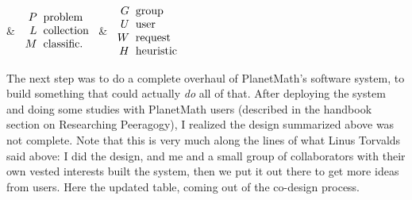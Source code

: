 \begin{center}
{\begin{tabular}
&
$\begin{array}{r@{\hspace{2mm}}l}
P &\mathrm{problem} \\
L &\mathrm{collection} \\
M &\mathrm{classific.}
\end{array}$ &
$\begin{array}{r@{\hspace{2mm}}l}
G &\mathrm{group}\\
U &\mathrm{user}\\
W &\mathrm{request} \\
H &\mathrm{heuristic}
\end{array}$
\\
\hline
\end{tabular}
}
\end{center}

The next step was to do a complete overhaul of PlanetMath's software
system, to build something that could actually \emph{do} all of that.
After deploying the system and doing some studies with PlanetMath users
(described in the handbook section on Researching Peeragogy), I realized
the design summarized above was not complete. Note that this is very
much along the lines of what Linus Torvalds said above: I did the
design, and me and a small group of collaborators with their own vested
interests built the system, then we put it out there to get more ideas
from users. Here the updated table, coming out of the co-design process.

